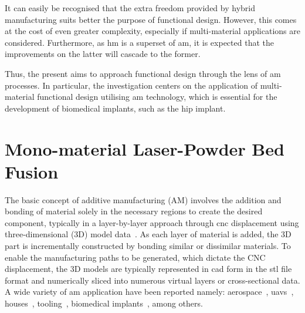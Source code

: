 It can easily be recognised that the extra freedom provided by hybrid
manufacturing suits better the purpose of functional design.
However, this comes at the cost of even greater complexity, especially if
multi-material applications are considered.
Furthermore,
as \gls{hm} is a superset of \gls{am}, it is expected that the improvements on
the latter will cascade to the former.

Thus, the present aims to approach functional design through the lens of
\gls{am} processes. In particular, the investigation centers on the application
of multi-material functional design utilising \gls{am} technology, which is
essential for the development of biomedical implants, such as the hip implant.

\section{Mono-material Laser-Powder Bed Fusion}%
\label{sec:monom-laser-powd}

The basic concept of additive manufacturing (AM) involves the addition and
bonding of material solely in the necessary regions to create the desired
component, typically in a layer-by-layer approach through \gls{cnc} displacement
using three-dimensional (3D) model data~\cite{thompson2015overview}. As each
layer of material is added, the 3D part is incrementally constructed by bonding
similar or dissimilar materials. To enable the manufacturing paths to be
generated, which dictate the CNC displacement, the 3D models are typically
represented in \gls{cad} form in the \gls{stl} file format and numerically
sliced into numerous virtual layers or cross-sectional data.
A wide variety of \gls{am} application have been reported namely:
aerospace~\cite{marques2022RocketEngine, hu2017design, boeing20173DPrinting},
\glspl{uav}~\cite{bronz2020mission, tadjdeh2014navy}, houses~\cite{stott2014chinese},
tooling~\cite{rannar2007efficient, dalgarno2001production}, biomedical
implants~\cite{bartolomeu2020additive, esmaeili2019artificial,cansiz2016computer}, among others.

